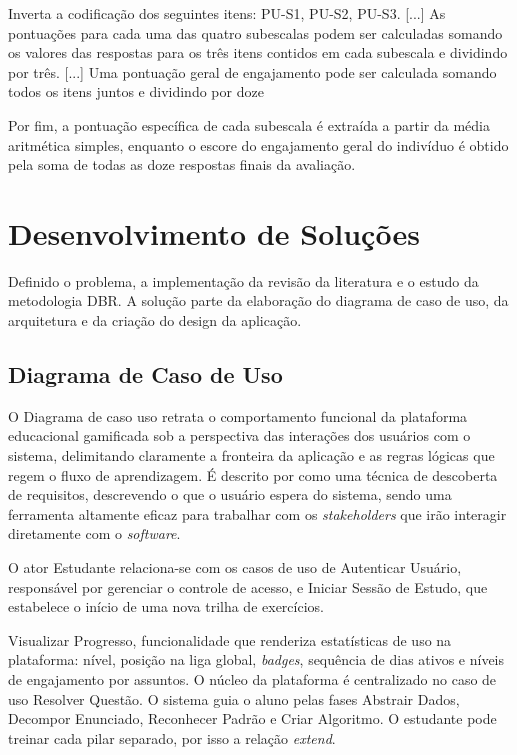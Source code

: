 \documentclass{abnt}
\begin{document}
\begin{citacao}
Inverta a codificação dos seguintes itens: PU-S1, PU-S2, PU-S3. [...] As
pontuações para cada uma das quatro subescalas podem ser calculadas somando os
valores das respostas para os três itens contidos em cada subescala e dividindo
por três. [...] Uma pontuação geral de engajamento pode ser calculada somando
todos os itens juntos e dividindo por doze \cite{obrien2018practical}
\end{citacao}

Por fim, a pontuação específica de cada subescala é extraída a partir da média
aritmética simples, enquanto o escore do engajamento geral do indivíduo é obtido
pela soma de todas as doze respostas finais da avaliação.

\section{Desenvolvimento de Soluções}
Definido o problema, a implementação da revisão da literatura e o estudo da
metodologia DBR. A solução parte da elaboração do diagrama de caso de uso, da
arquitetura e da criação do design da aplicação.

\subsection{Diagrama de Caso de Uso}
O Diagrama de caso uso retrata o comportamento funcional da plataforma
educacional gamificada sob a perspectiva das interações dos usuários com o
sistema, delimitando claramente a fronteira da aplicação e as regras lógicas que
regem o fluxo de aprendizagem. É descrito por \cite{sommerville2011} como uma
técnica de descoberta de requisitos, descrevendo o que o usuário espera do
sistema, sendo uma ferramenta altamente eficaz para trabalhar com os
\textit{stakeholders} que irão interagir diretamente com o \textit{software}.

O ator Estudante relaciona-se com os casos de uso de Autenticar Usuário,
responsável por gerenciar o controle de acesso, e Iniciar Sessão de Estudo, que
estabelece o início de uma nova trilha de exercícios.

Visualizar Progresso, funcionalidade que renderiza estatísticas de uso na
plataforma: nível, posição na liga global, \textit{badges}, sequência de dias
ativos e níveis de engajamento por assuntos.
\newpage
O núcleo da plataforma é centralizado no caso de uso Resolver Questão. O sistema
guia o aluno pelas fases Abstrair Dados, Decompor Enunciado, Reconhecer Padrão e
Criar Algoritmo. O estudante pode treinar cada pilar separado, por isso a
relação \textit{extend}. 
\end{document}
